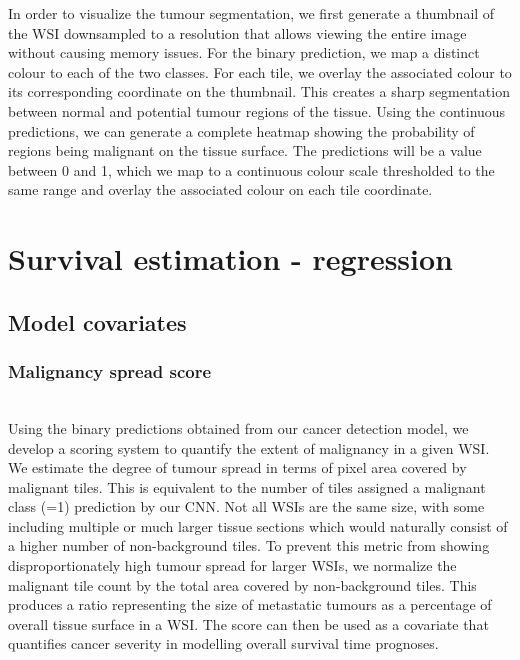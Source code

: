 \documentclass{l4proj}
\begin{document}
In order to visualize the tumour segmentation, we first generate a thumbnail of the WSI downsampled to a resolution that allows viewing the entire image without causing memory issues. For the binary prediction, we map a distinct colour to each of the two classes. For each tile, we overlay the associated colour to its corresponding coordinate on the thumbnail. This creates a sharp segmentation between normal and potential tumour regions of the tissue. Using the continuous predictions, we can generate a complete heatmap showing the  probability of regions being malignant on the tissue surface. The predictions will be a value between 0 and 1, which we map to a continuous colour scale thresholded to the same range and overlay the associated colour on each tile coordinate. 

\section{Survival estimation - regression}
\subsection{Model covariates} \label{sec:covariates}
\subsubsection{Malignancy spread score} 
\hfill\\
Using the binary predictions obtained from our cancer detection model, we develop a scoring system to quantify the extent of malignancy in a given WSI. We estimate the degree of tumour spread in terms of pixel area covered by malignant tiles. This is equivalent to the number of tiles assigned a malignant 
class (=1) prediction by our CNN. Not all WSIs are the same size, with some including multiple or much larger tissue sections which would naturally consist of a higher number of non-background tiles. To prevent this metric from showing disproportionately high tumour spread for larger WSIs, we normalize the malignant tile count by the total area covered by non-background tiles. This produces a ratio representing the size of metastatic tumours as a percentage of overall tissue surface in a WSI. The score can then be used as a covariate that quantifies cancer severity in modelling overall survival time prognoses. 
\end{document}
